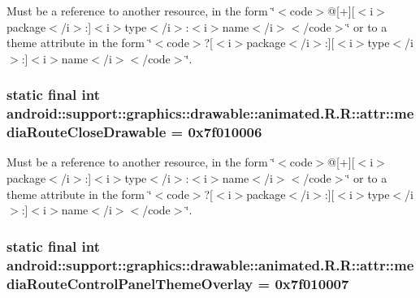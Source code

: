 Must be a reference to another resource, in the form \char`\"{}$<$code$>$@\mbox{[}+\mbox{]}\mbox{[}$<$i$>$package$<$/i$>$:\mbox{]}$<$i$>$type$<$/i$>$:$<$i$>$name$<$/i$>$$<$/code$>$\char`\"{} or to a theme attribute in the form \char`\"{}$<$code$>$?\mbox{[}$<$i$>$package$<$/i$>$:\mbox{]}\mbox{[}$<$i$>$type$<$/i$>$:\mbox{]}$<$i$>$name$<$/i$>$$<$/code$>$\char`\"{}. \hypertarget{classandroid_1_1support_1_1graphics_1_1drawable_1_1animated_1_1_r_1_1attr_b18c3f8b6861dfab21cafc9319414aec}{
\subsubsection[{mediaRouteCloseDrawable}]{\setlength{\rightskip}{0pt plus 5cm}static final int android::support::graphics::drawable::animated.R.R::attr::mediaRouteCloseDrawable = 0x7f010006}}
\label{classandroid_1_1support_1_1graphics_1_1drawable_1_1animated_1_1_r_1_1attr_b18c3f8b6861dfab21cafc9319414aec}


Must be a reference to another resource, in the form \char`\"{}$<$code$>$@\mbox{[}+\mbox{]}\mbox{[}$<$i$>$package$<$/i$>$:\mbox{]}$<$i$>$type$<$/i$>$:$<$i$>$name$<$/i$>$$<$/code$>$\char`\"{} or to a theme attribute in the form \char`\"{}$<$code$>$?\mbox{[}$<$i$>$package$<$/i$>$:\mbox{]}\mbox{[}$<$i$>$type$<$/i$>$:\mbox{]}$<$i$>$name$<$/i$>$$<$/code$>$\char`\"{}. \hypertarget{classandroid_1_1support_1_1graphics_1_1drawable_1_1animated_1_1_r_1_1attr_cb4a26d027ff9d7d1a18dc54699efd5b}{
\subsubsection[{mediaRouteControlPanelThemeOverlay}]{\setlength{\rightskip}{0pt plus 5cm}static final int android::support::graphics::drawable::animated.R.R::attr::mediaRouteControlPanelThemeOverlay = 0x7f010007}}
\label{classandroid_1_1support_1_1graphics_1_1drawable_1_1animated_1_1_r_1_1attr_cb4a26d027ff9d7d1a18dc54699efd5b}


